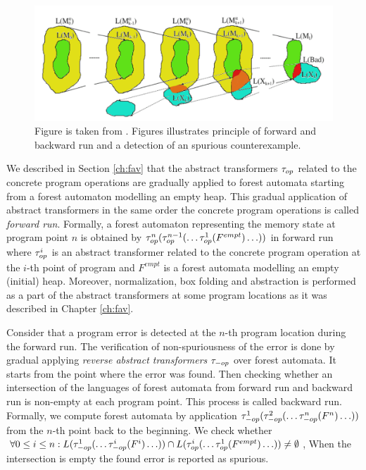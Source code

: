 \begin{figure}[t]
	\centering
	\includegraphics[scale=0.9]{fig/artmc.png}
	\caption{
		Figure is taken from \cite{artmc}.
		Figures illustrates principle of forward and backward run and
		a detection of an spurious counterexample.}
	\label{fig:bwrun}
\end{figure}

We described in Section \ref{ch:fav} that the abstract transformers $\tau_{op}$
related to the concrete program operations are gradually applied to forest automata
starting from a forest automaton modelling an empty heap.
This gradual application of abstract transformers in the same order
the concrete program operations is called \emph{forward run}.
Formally, a forest automaton representing the memory state 
at program point $n$ is obtained by
$\tau_{op}^n(\tau_{op}^{n-1}(\ldots \tau_{op}^{1}(F^{empt}) \ldots))$ in forward run
where $\tau_{op}^i$ is an abstract transformer related to the concrete
program operation at the $i$-th point of program and $F^{empt}$ is
a forest automata modelling an empty (initial) heap.
Moreover, normalization, box folding and abstraction is performed
as a part of the abstract transformers at some program locations as
it was described in Chapter \ref{ch:fav}.

Consider that a program error is detected at the $n$-th program location
during the forward run.
The verification of non-spuriousness of the error is done by gradual applying
\emph{reverse abstract transformers} $\tau_{-op}$ over forest automata.
It starts from the point where the error was found.
Then checking whether an intersection of the languages of forest automata from forward run
and backward run is non-empty at each program point.
This process is called backward run.
Formally, we compute forest automata by application $\tau_{-op}^1(\tau_{-op}^{2}(\ldots \tau_{-op}^{n}(F^{n}) \ldots))$
from the $n$-th point back to the beginning.
We check whether $\forall 0 \leq i \leq n: L(\tau_{-op}^1(\ldots \tau_{-op}^{i}(F^{i}) \ldots)) \cap
L(\tau_{op}^i(\ldots \tau_{op}^{1}(F^{empt}) \ldots)) \neq \emptyset$,
When the intersection is empty the found error is reported as spurious.

